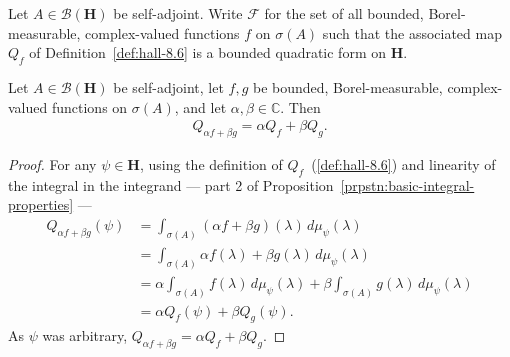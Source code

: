\begin{definition}
    \label{def:F-class}
    \leanok
    Let $A \in \mathcal{B}(\mathbf{H})$ be self-adjoint. Write $\mathcal{F}$ for the set of all bounded, Borel-measurable, complex-valued functions $f$ on $\sigma(A)$ such that the associated map $Q_f$ of Definition~\ref{def:hall-8.6} is a bounded quadratic form on $\mathbf{H}$.
\end{definition}

\begin{proposition}
    \label{prpstn:Q-is-linear}
    \leanok
    Let $A \in \mathcal{B}(\mathbf{H})$ be self-adjoint, let $f,g$ be bounded, Borel-measurable, complex-valued functions on $\sigma(A)$, and let $\alpha,\beta \in \mathbb{C}$. Then
    \begin{align}
        Q_{\alpha f + \beta g} = \alpha Q_f + \beta Q_g.
    \end{align}
\end{proposition}
\begin{proof}
    \leanok
For any $\psi \in \mathbf{H}$, using the definition of $Q_f$~(\ref{def:hall-8.6}) and linearity of the integral in the integrand — part 2 of Proposition~\ref{prpstn:basic-integral-properties} —
\begin{align}
    Q_{\alpha f + \beta g}(\psi) &= \int_{\sigma(A)} (\alpha f + \beta g)(\lambda) \, d\mu_\psi(\lambda) \\
                                 &= \int_{\sigma(A)} \alpha f(\lambda) + \beta g(\lambda) \, d\mu_\psi(\lambda) \\
                                 &= \alpha \int_{\sigma(A)} f(\lambda) \, d\mu_\psi(\lambda) + \beta \int_{\sigma(A)} g(\lambda) \, d\mu_\psi(\lambda) \\
                                 &= \alpha Q_f(\psi) + \beta Q_g(\psi).
\end{align}
As $\psi$ was arbitrary, $Q_{\alpha f + \beta g} = \alpha Q_f + \beta Q_g$.
\end{proof}

